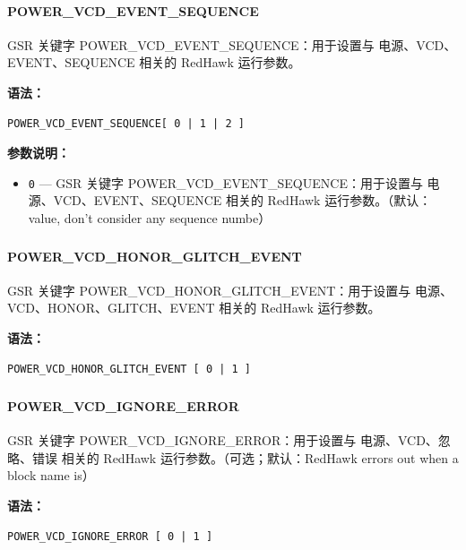 \paragraph*{POWER_VCD_EVENT_SEQUENCE}

GSR 关键字 POWER_VCD_EVENT_SEQUENCE：用于设置与 电源、VCD、EVENT、SEQUENCE 相关的 RedHawk 运行参数。

\textbf{语法：}
\begin{lstlisting}
POWER_VCD_EVENT_SEQUENCE[ 0 | 1 | 2 ]
\end{lstlisting}

\textbf{参数说明：}
\begin{itemize}
\item \texttt{0} — GSR 关键字 POWER\_VCD\_EVENT\_SEQUENCE：用于设置与 电源、VCD、EVENT、SEQUENCE 相关的 RedHawk 运行参数。（默认：value, don't consider any sequence numbe）
\end{itemize}

\subsubsection{}
\paragraph*{POWER_VCD_HONOR_GLITCH_EVENT}

GSR 关键字 POWER_VCD_HONOR_GLITCH_EVENT：用于设置与 电源、VCD、HONOR、GLITCH、EVENT 相关的 RedHawk 运行参数。

\textbf{语法：}
\begin{lstlisting}
POWER_VCD_HONOR_GLITCH_EVENT [ 0 | 1 ]
\end{lstlisting}

\subsubsection{}
\paragraph*{POWER_VCD_IGNORE_ERROR}

GSR 关键字 POWER_VCD_IGNORE_ERROR：用于设置与 电源、VCD、忽略、错误 相关的 RedHawk 运行参数。（可选；默认：RedHawk errors out when a block name is）

\textbf{语法：}
\begin{lstlisting}
POWER_VCD_IGNORE_ERROR [ 0 | 1 ]
\end{lstlisting}

